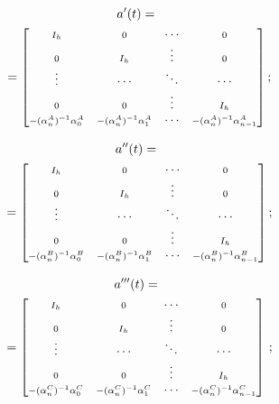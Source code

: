 \begin{multicols}{2}
\noindent
\begin{multline}
a'(t) ={}\\
{}=\begin{bmatrix}\scriptstyle
    I_h&\scriptstyle 0& \cdots& \scriptstyle 0\\
  \scriptstyle  0&\scriptstyle I_h&\scriptstyle \vdots&\scriptstyle 0\\
   \scriptstyle  \vdots&\cdots&\scriptstyle\ddots&\cdots\\
\scriptstyle    0&\scriptstyle 0&\scriptstyle\vdots&\scriptstyle I_h\\
    \scriptstyle-(\alpha_n^A)^{-1}\alpha_0^A&\scriptstyle -(\alpha_n^A)^{-1}\alpha_1^A&
    \cdots& \scriptstyle-(\alpha_n^A)^{-1} \alpha_{n-1}^A
    \end{bmatrix};
    \end{multline}

\vspace*{-12pt}

\noindent
\begin{multline}
a''(t) ={}\\
{}=\begin{bmatrix}
    \scriptstyle I_h&\scriptstyle 0& \cdots&\scriptstyle 0\\
   \scriptstyle 0&\scriptstyle I_h&\scriptstyle \vdots&\scriptstyle 0\\
  \scriptstyle  \vdots& \cdots&\scriptstyle \ddots& \cdots\\
  \scriptstyle  0&\scriptstyle 0&\scriptstyle \vdots&\scriptstyle I_h\\
   \scriptstyle -(\alpha_n^B)^{-1}\alpha_0^B& \scriptstyle-(\alpha_n^B)^{-1}\alpha_1^B&
\cdots&\scriptstyle -(\alpha_n^B)^{-1}\alpha_{n-1}^B
    \end{bmatrix};
    \end{multline}
    
\vspace*{-12pt}

\noindent
\begin{multline}
a'''(t) ={}\\
{}=\begin{bmatrix}
    \scriptstyle I_h&\scriptstyle0&\cdots&\scriptstyle 0\\
  \scriptstyle  0&\scriptstyle I_h&\scriptstyle \vdots&\scriptstyle 0\\
    \scriptstyle\vdots&\cdots&\scriptstyle\ddots&\cdots\\
\scriptstyle    0&\scriptstyle 0&\scriptstyle \vdots&\scriptstyle I_h\\
 \scriptstyle   -(\alpha_n^C)^{-1}\alpha_0^C&\scriptstyle -(\alpha_n^C)^{-1}\alpha_1^C&
\cdots&\scriptstyle-(\alpha_n^C)^{-1}\alpha_{n-1}^C
    \end{bmatrix}\,;\label{e3.13-s}
\end{multline}


\end{multicols}
